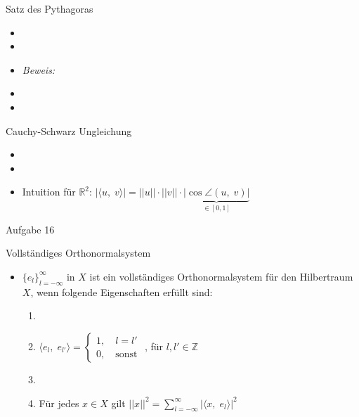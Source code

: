 \documentclass[14pt, aspectratio=169, handout]{beamer}
\begin{document}
\begin{frame}{Satz des Pythagoras}
    \begin{itemize}
        \item[] 
        \item[] 
        \item[] \textit{Beweis:} 
        \item[]
        \item[] 
    \end{itemize}
\end{frame}

\begin{frame}{Cauchy-Schwarz Ungleichung}
    \begin{itemize}
        \item[] 
        \item[] 
        \item[] Intuition für $\mathbb{R}^2$: \hspace{10pt} $\left| \langle u, \; v \rangle \right| = ||u|| \cdot ||v|| \cdot \underbrace{\left| \cos \angle(u, \; v) \right|}_{\in [0,1]}$
    \end{itemize}
\end{frame}

\begin{frame}{Aufgabe 16}
    
\end{frame}

\begin{frame}{Vollständiges Orthonormalsystem}
    \begin{itemize}
        \item $\{e_l\}_{l = -\infty}^\infty$ in $X$ ist ein vollständiges Orthonormalsystem für den Hilbertraum $X$, wenn folgende Eigenschaften erfüllt sind:
        \begin{enumerate}
            \item[]
            \item $\langle e_l, \; e_{l'} \rangle = \begin{cases}
                1, \hspace{12pt} l = l' \\
                0, \hspace{12pt} \text{sonst}
            \end{cases}$ \hspace{12pt}, für $l,l' \in \mathbb{Z}$
            \item[] 
            \item Für jedes $x\in X$ gilt $||x||^2 = \displaystyle\sum_{l=-\infty}^\infty |\langle x, \; e_l \rangle|^2$
        \end{enumerate}
    \end{itemize}
\end{frame}
\end{document}

